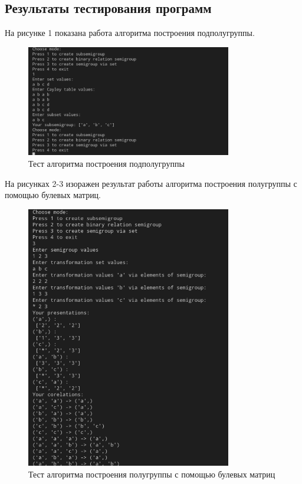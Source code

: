 \documentclass[bachelor, och, labwork]{shiza}
\begin{document}
        \inputminted[fontsize=\small]{python}{code/aua-lab-4.py}

      \newpage
      
      \subsection{Результаты тестирования программ}
      
      На рисунке 1 показана работа алгоритма построения подполугруппы.

      \begin{figure}[H]
        \centering
        \includegraphics[width=0.8\textwidth]{photo/1.png}
        \caption{Тест алгоритма построения подполугруппы}
      \end{figure}

      На рисунках 2-3 изоражен результат работы алгоритма построения полугруппы с помощью булевых матриц.

      \begin{figure}[H]
        \centering
        \includegraphics[width=0.8\textwidth]{photo/2.png}
        \caption{Тест алгоритма построения полугруппы с помощью булевых матриц}
      \end{figure}
\end{document}
